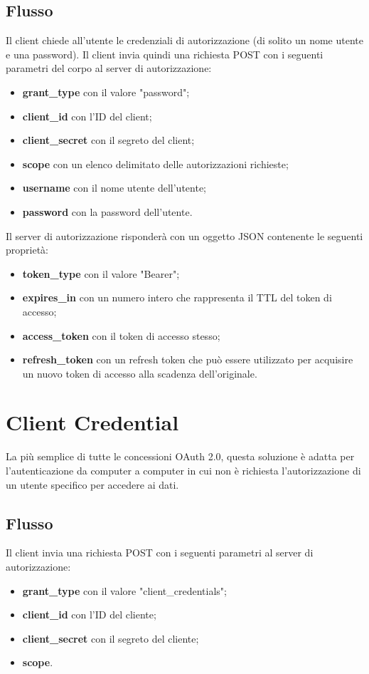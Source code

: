 \subsection{Flusso}
Il client chiede all'utente le credenziali di autorizzazione (di solito un nome utente e una password). Il client invia quindi una richiesta POST con i seguenti parametri del corpo al server di autorizzazione:
\begin{itemize}
    \item \textbf{grant\_type} con il valore "password";
    \item \textbf{client\_id} con l'ID del client;
    \item \textbf{client\_secret} con il segreto del client;
    \item \textbf{scope} con un elenco delimitato delle autorizzazioni richieste;
    \item \textbf{username} con il nome utente dell'utente;
    \item \textbf{password} con la password dell'utente.
\end{itemize}

\noindent Il server di autorizzazione risponderà con un oggetto JSON contenente le seguenti proprietà:
\begin{itemize}
    \item \textbf{token\_type} con il valore "Bearer";
    \item \textbf{expires\_in} con un numero intero che rappresenta il TTL del token di accesso;
    \item \textbf{access\_token} con il token di accesso stesso;
    \item \textbf{refresh\_token} con un refresh token che può essere utilizzato per acquisire un nuovo token di accesso alla scadenza dell'originale.
\end{itemize}

\section{Client Credential}
La più semplice di tutte le concessioni OAuth 2.0, questa soluzione è adatta per l'autenticazione da computer a computer in cui non è richiesta l'autorizzazione di un utente specifico per accedere ai dati.

\subsection{Flusso}
Il client invia una richiesta POST con i seguenti parametri al server di autorizzazione:
\begin{itemize}
    \item \textbf{grant\_type} con il valore "client\_credentials";
    \item \textbf{client\_id} con l'ID del cliente;
    \item \textbf{client\_secret} con il segreto del cliente;
    \item \textbf{scope}.
\end{itemize}

